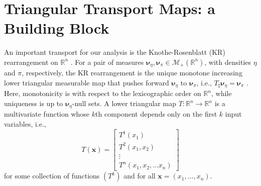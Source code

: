 \documentclass[twoside,11pt]{article}
\newcommand{\push}{_\sharp}                                      %
\newcommand{\borelm}{\mathscr{M}}
\newcommand{\borelmp}{\borelm_+}
\newcommand{\genm}{\boldsymbol{\nu} }   %
\newcommand{\re}{\mathbb{R}}
\newcommand{\ra}{\rightarrow}
\newcommand{\xb}{\boldsymbol{x}}
\newcommand{\emap}{T}                          %
\begin{document}



  



%

\section{Triangular Transport Maps: a Building Block}
\label{sec:compTransport}
%
%

An important transport for our analysis is the  Knothe-Rosenblatt (KR)
%
rearrangement on $\re^n$ 
\citep{rosenblatt1952remarks}.
%
For a pair of measures
$\genm_{\eta}, \genm_{\pi} \in \borelmp(\re^n)$, with
densities $\eta$ and $\pi$, respectively, 
%
%
%
%
the KR rearrangement is the unique  
monotone increasing lower triangular measurable map %
that pushes forward $\genm_{\eta}$ to $\genm_{\pi}$, i.e.,  
$T\push \genm_{\eta} = \genm_{\pi}$
\citep{carlier2010knothe}. 
%
Here, monotonicity is with respect to the 
lexicographic order on $\re^n$, while uniqueness is up to
$\genm_{\eta}$-null sets. %
A lower triangular map $T:\re^n\ra\re^n$ is a multivariate 
function whose $k$th component depends only on the first $k$ input variables, i.e.,
\begin{equation}   
\emap( \xb ) = \left[\begin{array}{l}
T^1(x_1)\\ 
T^2(x_1,x_2)\\ 
\vdots \\ 
T^n(x_1,x_2,\dots x_n)
\end{array}\right]%
\label{eq:lowerTri}
\end{equation}
for some collection of functions
%
$(T^k)$ and for all $\xb=(x_1,\ldots,x_n)$.
%
%
%
\end{document}

